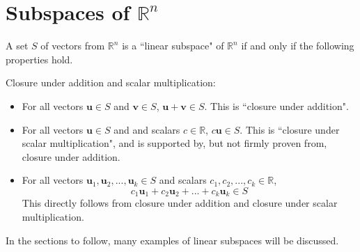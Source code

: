 \documentclass{article}
\begin{document}
\section*{Subspaces of $\mathbb{R}^n$}

A set \(S\) of vectors from \(\mathbb{R}^n\) is a ``linear subspace" of \(\mathbb{R}^n\) if and only if the following properties hold.

Closure under addition and scalar multiplication:
\begin{itemize}
\item For all vectors \(\mathbf{u} \in S\) and \(\mathbf{v} \in S\), \(\mathbf{u} + \mathbf{v} \in S\). This is ``closure under addition".
\item For all vectors \(\mathbf{u} \in S\) and and scalars \(c \in \mathbb{R}\), \(c \mathbf{u} \in S\). This is ``closure under scalar multiplication", and is supported by, but not firmly proven from, closure under addition.
\item For all vectors \(\mathbf{u}_1, \mathbf{u}_2, ..., \mathbf{u}_k \in S\) and scalars \(c_1, c_2, ..., c_k \in \mathbb{R}\), 
\[c_1 \mathbf{u}_1 + c_2 \mathbf{u}_2 + ... + c_k \mathbf{u}_k \in S\] 
This directly follows from closure under addition and closure under scalar multiplication.
\end{itemize}

In the sections to follow, many examples of linear subspaces will be discussed. 
\end{document}
